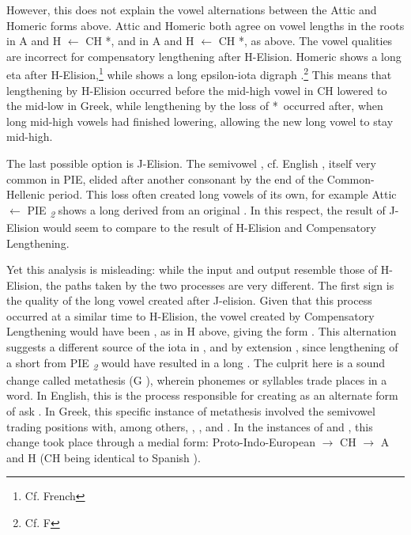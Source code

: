 However, this does not explain the vowel alternations between the Attic and Homeric forms above. Attic and Homeric both agree on vowel lengths in the roots  in A  and H  $\gets$ CH *,\autocite[]{Beekes_2009} and  in A and H  $\gets$ CH *, as above. The vowel qualities are incorrect for compensatory lengthening after H-Elision. Homeric  shows a long eta  after H-Elision,\footnote{Cf. French } while  shows a long epsilon-iota digraph .\footnote{Cf. F } This means that lengthening by H-Elision occurred before the mid-high vowel  in CH lowered to the mid-low  in Greek, while lengthening by the loss of *\w\ occurred after, when long mid-high vowels had finished lowering, allowing the new long vowel  to stay mid-high. 

The last possible option is J-Elision. The semivowel , cf. English , itself very common in PIE, elided after another consonant by the end of the Common-Hellenic period.\autocite[196]{Smyth_2013} This loss often created long vowels of its own, for example Attic  $\gets$ PIE \textit{\textsubscript{2}} shows a long  derived from an original  .\autocite[τείνω]{Beekes_2009} In this respect, the result of J-Elision would seem to compare to the result of H-Elision and Compensatory Lengthening.

Yet this analysis is misleading: while the input and output resemble those of H-Elision, the paths taken by the two processes are very different. The first sign is the quality of the long vowel created after J-elision. Given that this process occurred at a similar time to H-Elision, the vowel created by Compensatory Lengthening would have been , as in H  above, giving the form .  This alternation suggests a different source of the iota  in , and by extension , since lengthening of a short  from PIE \textit{\textsubscript{2}} would have resulted in a long . The culprit here is a sound change called metathesis (G ), wherein phonemes or syllables trade places in a word. In English, this is the process responsible for creating  as an alternate form  of ask . In Greek, this specific instance of metathesis involved the semivowel  trading positions with,  among others, , , and . In the instances of  and , this change took place through a medial form: Proto-Indo-European  $\to$ CH  $\to$ A and H  (CH  being identical to Spanish ).

